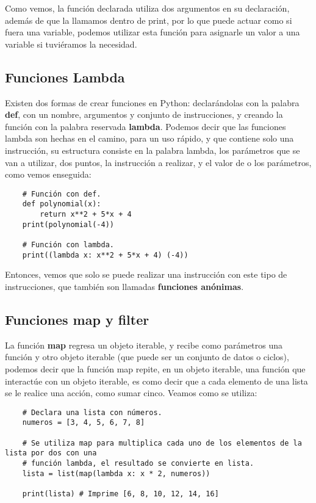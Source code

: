 Como vemos, la función declarada utiliza dos argumentos en su declaración, además de que la llamamos dentro de print, por lo que puede actuar como si fuera una variable, podemos utilizar esta función para asignarle un valor a una variable si tuviéramos la necesidad.


\subsection{Funciones Lambda}

Existen dos formas de crear funciones en Python: declarándolas con la palabra \textbf{def}, con un nombre, argumentos y conjunto de instrucciones, y creando la función con la palabra reservada \textbf{lambda}. Podemos decir que las funciones lambda son hechas en el camino, para un uso rápido, y que contiene solo una instrucción, su estructura consiste en la palabra lambda, los parámetros que se van a utilizar, dos puntos, la instrucción a realizar, y el valor de o los parámetros, como vemos enseguida:
\begin{lstlisting}
    # Función con def.
    def polynomial(x):
        return x**2 + 5*x + 4
    print(polynomial(-4))

    # Función con lambda.
    print((lambda x: x**2 + 5*x + 4) (-4))
\end{lstlisting}

Entonces, vemos que solo se puede realizar una instrucción con este tipo de instrucciones, que también son llamadas \textbf{funciones anónimas}.


\subsection{Funciones map y filter}

La función \textbf{map} regresa un objeto iterable, y recibe como parámetros una función y otro objeto iterable (que puede ser un conjunto de datos o ciclos), podemos decir que la función map repite, en un objeto iterable, una función que interactúe con un objeto iterable, es como decir que a cada elemento de una lista se le realice una acción, como sumar cinco. Veamos como se utiliza:
\begin{lstlisting}
    # Declara una lista con números.
    numeros = [3, 4, 5, 6, 7, 8]

    # Se utiliza map para multiplica cada uno de los elementos de la lista por dos con una
    # función lambda, el resultado se convierte en lista.
    lista = list(map(lambda x: x * 2, numeros))

    print(lista) # Imprime [6, 8, 10, 12, 14, 16]
\end{lstlisting}

